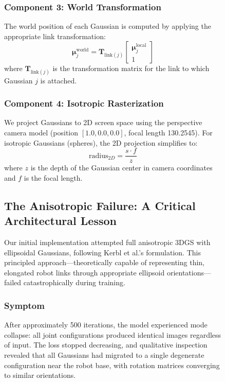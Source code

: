 \documentclass[12pt,a4paper,oneside]{report}
\begin{document}
\begin{figure}[H]
\subsubsection{Component 3: World Transformation}

The world position of each Gaussian is computed by applying the appropriate link transformation:
\begin{equation}
\boldsymbol{\mu}_j^{\text{world}} = \mathbf{T}_{\text{link}(j)} \begin{bmatrix} \boldsymbol{\mu}_j^{\text{local}} \\ 1 \end{bmatrix}
\end{equation}
where $\mathbf{T}_{\text{link}(j)}$ is the transformation matrix for the link to which Gaussian $j$ is attached.

\subsubsection{Component 4: Isotropic Rasterization}

We project Gaussians to 2D screen space using the perspective camera model (position $[1.0, 0.0, 0.0]$, focal length 130.2545). For isotropic Gaussians (spheres), the 2D projection simplifies to:
\begin{equation}
\text{radius}_{2D} = \frac{s \cdot f}{z}
\end{equation}
where $z$ is the depth of the Gaussian center in camera coordinates and $f$ is the focal length.

\subsection{The Anisotropic Failure: A Critical Architectural Lesson}

Our initial implementation attempted full anisotropic 3DGS with ellipsoidal Gaussians, following Kerbl et al.'s formulation. This principled approach---theoretically capable of representing thin, elongated robot links through appropriate ellipsoid orientations---failed catastrophically during training.

\subsubsection{Symptom}

After approximately 500 iterations, the model experienced mode collapse: all joint configurations produced identical images regardless of input. The loss stopped decreasing, and qualitative inspection revealed that all Gaussians had migrated to a single degenerate configuration near the robot base, with rotation matrices converging to similar orientations.


\end{figure}
\end{document}
